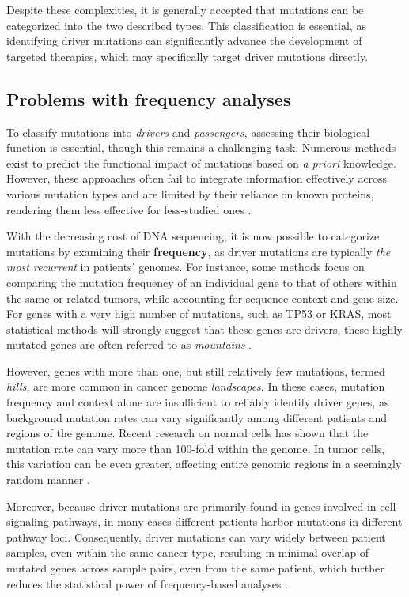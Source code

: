 Despite these complexities, it is generally accepted that mutations can be categorized into the two described types. This classification is essential, as identifying driver mutations can significantly advance the development of targeted therapies, which may specifically target driver mutations directly.

\subsection{Problems with frequency analyses}

To classify mutations into \textit{drivers} and \textit{passengers}, assessing their biological function is essential, though this remains a challenging task. Numerous methods exist to predict the functional impact of mutations based on \textit{a priori} knowledge. However, these approaches often fail to integrate information effectively across various mutation types and are limited by their reliance on known proteins, rendering them less effective for less-studied ones \cite{multi-dendrix}.

With the decreasing cost of DNA sequencing, it is now possible to categorize mutations by examining their \textbf{frequency}, as driver mutations are typically \textit{the most recurrent} in patients' genomes. For instance, some methods focus on comparing the mutation frequency of an individual gene to that of others within the same or related tumors, while accounting for sequence context and gene size. For genes with a very high number of mutations, such as \href{https://www.ncbi.nlm.nih.gov/gene/7157}{TP53} or \href{https://www.ncbi.nlm.nih.gov/gene/3845}{KRAS}, most statistical methods will strongly suggest that these genes are drivers; these highly mutated genes are often referred to as \textit{mountains} \cite{multi-dendrix, vogelstein2013}.

However, genes with more than one, but still relatively few mutations, termed \textit{hills}, are more common in cancer genome \textit{landscapes}. In these cases, mutation frequency and context alone are insufficient to reliably identify driver genes, as background mutation rates can vary significantly among different patients and regions of the genome. Recent research on normal cells has shown that the mutation rate can vary more than 100-fold within the genome. In tumor cells, this variation can be even greater, affecting entire genomic regions in a seemingly random manner \cite{vogelstein2013}.

Moreover, because driver mutations are primarily found in genes involved in cell signaling pathways, in many cases different patients harbor mutations in different pathway loci. Consequently, driver mutations can vary widely between patient samples, even within the same cancer type, resulting in minimal overlap of mutated genes across sample pairs, even from the same patient, which further reduces the statistical power of frequency-based analyses \cite{multi-dendrix, mdpfinder}.


